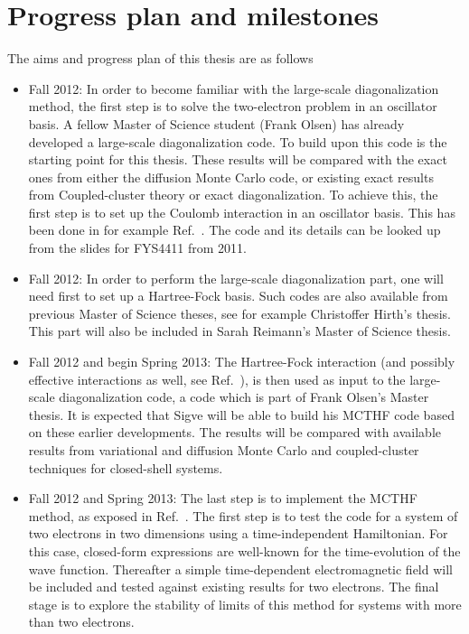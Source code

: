 \documentclass[twocolumn]{revtex4}
\begin{document}
\section*{Progress plan and milestones}
The aims and progress plan of this thesis are as follows
\begin{itemize}
\item Fall 2012: In order to become familiar with the large-scale diagonalization method, 
the first step is to solve 
the two-electron problem in an oscillator basis. A fellow Master of Science student (Frank Olsen) has already developed a large-scale diagonalization code. To build 
upon this code is the starting point for this thesis.
These results will be compared with the exact ones from either the diffusion Monte Carlo code, or existing
exact results from Coupled-cluster theory or exact diagonalization\cite{us2011}.  
To achieve this, the first step is to
set up the Coulomb interaction in an oscillator basis. 
This has been done in for example Ref.~\cite{us2011}. The code
and its details can be looked up from the slides for FYS4411 from 2011. 
\item Fall 2012: In order to perform the large-scale diagonalization part, one will need first to set up a Hartree-Fock basis. Such codes are also available from previous Master of Science theses, see for example
Christoffer Hirth's thesis. This part will also be included in Sarah Reimann's Master of Science thesis.
\item Fall 2012 and begin Spring 2013: The Hartree-Fock interaction (and possibly effective interactions as well, see Ref.~\cite{us2011}), is then used as input to the large-scale diagonalization code, a code which is part of Frank Olsen's Master thesis. It is expected that Sigve will be able to build his MCTHF code 
based on these earlier developments.   
The results will be compared with available results from variational and diffusion Monte Carlo  and coupled-cluster
techniques for closed-shell systems. 
\item Fall 2012 and Spring 2013: 
The last step is to implement the MCTHF method, as exposed in Ref.~\cite{mcthf}. 
The first step is to test the code for a system of two electrons in two dimensions using 
a time-independent Hamiltonian. For this case, closed-form expressions are well-known for the time-evolution of the wave function. Thereafter a simple time-dependent electromagnetic field will be included and tested
against existing results for two electrons.  The final stage is to explore the stability of limits of this method for systems with more than two electrons. 

\end{itemize}
\end{document}
